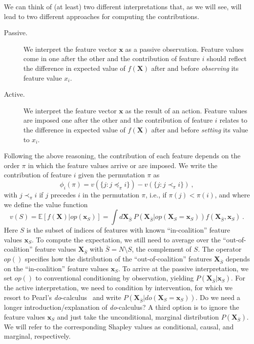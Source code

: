 \documentclass{article}
\newcommand{\vX}{\mathbf{X}}
\newcommand{\vx}{\mathbf{x}}
\newcommand{\expectation}{\mathbb{E}}
\newcommand{\contribution}{{\phi}}
\newcommand{\val}{{v}}
\newcommand{\dodo}{\mathit{do}}
\newcommand{\lvdo}[1]{\dodo(\vX_{#1} = \vx_{#1})}
\newcommand{\perm}{\pi}
\newcommand{\operator}{\mathit{op}}
\newcommand{\svop}[1]{\operator(\vx_{#1})}
\newcommand{\lvop}[1]{\operator(\vX_{#1} = \vx_{#1})}
\newcommand{\allfeatures}{{N}}
\newcommand{\comment}[1]{{\color{red} #1}}
\begin{document}
We can think of (at least) two different interpretations that, as we will see, will lead to two different approaches for computing the contributions.
\begin{description}
	\item[Passive.] We interpret the feature vector $\vx$ as a passive observation. Feature values come in one after the other and the contribution of feature $i$ should reflect the difference in expected value of $f(\vX)$ after and before {\em observing} its feature value $x_i$.
	\item[Active.] We interpret the feature vector $\vx$ as the result of an action. Feature values are imposed one after the other and the contribution of feature $i$ relates to the difference in expected value of $f(\vX)$ after and before {\em setting} its value to $x_i$.
\end{description}
Following the above reasoning, the contribution of each feature  depends on the order $\perm$ in which the feature values arrive or are imposed. We write the contribution of feature $i$ given the permutation $\perm$ as
\begin{equation}
\contribution_i(\perm) = \val(\{j: j \preceq_\perm i\}) - \val(\{j: j \prec_\perm i\}) \: ,
\label{eq:contperm}
\end{equation}
with $j \prec_\perm i$ if $j$ precedes $i$ in the permutation $\perm$, i.e., if $\perm(j) < \perm(i)$, and where we define the value function
\begin{equation}
\val(S) = \expectation \left[f(\vX) | \svop{S} \right] = \int d\vX_{\bar{S}} \: P(\vX_{\bar{S}}|\lvop{S}) f(\vX_{\bar{S}},\vx_S) \: .
\label{eq:valuedef}
\end{equation}
Here $S$ is the subset of indices of features with known ``in-coalition'' feature values $\vx_S$. To compute the expectation, we still need to average over the ``out-of-coalition'' feature values $\vX_{\bar{S}}$ with $\bar{S} = \allfeatures \setminus S$, the complement of $S$. The operator $\operator()$ specifies how the distribution of the ``out-of-coalition'' features $\vX_{\bar{S}}$ depends on the ``in-coalition'' feature values $\vx_{S}$. To arrive at the passive interpretation, we set $\operator()$ to conventional conditioning by observation, yielding $P(\vX_{\bar{S}}|\vx_{S})$. For the active interpretation, we need to condition by intervention, for which we resort to Pearl's \textit{do}-calculus~\cite{pearl1995causal} and write $P(\vX_{\bar{S}}|\lvdo{S})$. \comment{Do we need a longer introduction/explanation of \textit{do}-calculus?} A third option is to ignore the feature values $\vx_S$ and just take the unconditional, marginal distribution $P(\vX_{\bar{S}})$. We will refer to the corresponding Shapley values as conditional, causal, and marginal, respectively.
\end{document}
